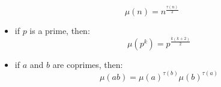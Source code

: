 $$\mu(n) = n^{\frac{\tau(n)}{2}}$$
\begin{itemize}
\item if $p$ is a prime, then: $$\mu(p^k) = p^{\frac{k(k+2)}{2}}$$
\item if $a$ and $b$ are coprimes, then: $$\mu(ab) = \mu(a)^{\tau(b)}\mu(b)^{\tau(a)}$$
\end{itemize}
